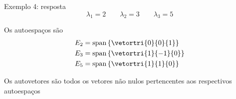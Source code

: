 \begin{frame}{Exemplo 4: resposta}
    \[
        \lambda_{1}=2
        \qquad
        \lambda_{2}=3
        \qquad
        \lambda_{3}=5
    \]

    Os autoespaços são
    \begin{align*}
        E_{2}&=\operatorname{span}
        \left\{\vetortri{0}{0}{1}\right\}\\
        E_{3}&=\operatorname{span}
        \left\{\vetortri{1}{-1}{0}\right\}\\
        E_{5}&=\operatorname{span}
        \left\{\vetortri{1}{1}{0}\right\}
    \end{align*}

    Os autovetores são todos os vetores não nulos pertencentes aos respectivos autoespaços
\end{frame}